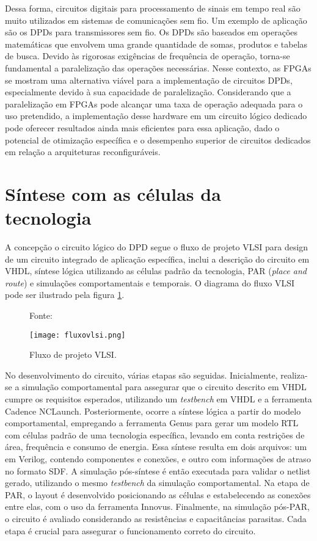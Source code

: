 Dessa forma, circuitos digitais para processamento de sinais em tempo real são muito utilizados em sistemas de comunicações sem fio. Um exemplo de aplicação são os DPDs para transmissores sem fio. Os DPDs são baseados em operações matemáticas que envolvem uma grande quantidade de somas, produtos e tabelas de busca. Devido às rigorosas exigências de frequência de operação, torna-se fundamental a paralelização das operações necessárias. Nesse contexto, as FPGAs se mostram uma alternativa viável para a implementação de circuitos DPDs, especialmente devido à sua capacidade de paralelização. Considerando que a paralelização em FPGAs pode alcançar uma taxa de operação adequada para o uso pretendido, a implementação desse hardware em um circuito lógico dedicado pode oferecer resultados ainda mais eficientes para essa aplicação, dado o potencial de otimização específica e o desempenho superior de circuitos dedicados em relação a arquiteturas reconfiguráveis.

\section{Síntese com as células da tecnologia}
A concepção o circuito lógico do DPD segue o fluxo de projeto VLSI para design de um circuito integrado de aplicação específica, inclui a descrição do circuito em VHDL, síntese lógica utilizando as células padrão da tecnologia, PAR (\textit{place and route}) e simulações comportamentais e temporais. O diagrama do fluxo VLSI pode ser ilustrado pela figura \ref{fig:CMOS2010}.

\begin{figure}[htbp!]
	\centering
	\captionsetup{justification=centering}
	\caption*{Fonte: \cite{CMOS2010}}
	\texttt{[image: fluxovlsi.png]}
	\caption{Fluxo de projeto VLSI.}
	\label{fig:CMOS2010}
\end{figure}

No desenvolvimento do circuito, várias etapas são seguidas. Inicialmente, realiza-se a simulação comportamental para assegurar que o circuito descrito em VHDL cumpre os requisitos esperados, utilizando um \textit{testbench} em VHDL e a ferramenta Cadence NCLaunch. Posteriormente, ocorre a síntese lógica a partir do modelo comportamental, empregando a ferramenta Genus para gerar um modelo RTL com células padrão de uma tecnologia específica, levando em conta restrições de área, frequência e consumo de energia. Essa síntese resulta em dois arquivos: um em Verilog, contendo componentes e conexões, e outro com informações de atraso no formato SDF. A simulação pós-síntese é então executada para validar o netlist gerado, utilizando o mesmo \textit{testbench} da simulação comportamental. Na etapa de PAR, o layout é desenvolvido posicionando as células e estabelecendo as conexões entre elas, com o uso da ferramenta Innovus. Finalmente, na simulação pós-PAR, o circuito é avaliado considerando as resistências e capacitâncias parasitas. Cada etapa é crucial para assegurar o funcionamento correto do circuito.

